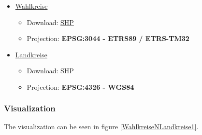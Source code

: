 \begin{itemize}
\itemsep1pt\parskip0pt
\item
	\href{http://www.bundeswahlleiter.de/en/bundestagswahlen/BTW_BUND_13/wahlkreiseinteilung/kartographische_darstellung.html}{Wahlkreise}

	\begin{itemize}
	\itemsep1pt\parskip0pt
	\item 
	Download:
	\href{http://www.bundeswahlleiter.de/de/bundestagswahlen/BTW_BUND_13/wahlkreiseinteilung/wahlkreisgeometrie/Geometrie_Wahlkreise_18DBT_VG1000_ETRS89.zip}{SHP}
	\item
	Projection: \textbf{EPSG:3044 - ETRS89 / ETRS-TM32}

\end{itemize}

\item
	\href{http://www.gadm.org/country}{Landkreise}
	
	\begin{itemize}
	\itemsep1pt\parskip0pt
	\item 
	Download: \href{http://biogeo.ucdavis.edu/data/gadm2/shp/DEU_adm.zip}{SHP}
	\item
	Projection: \textbf{EPSG:4326 - WGS84}
	\end{itemize}

\end{itemize}
\subsubsection{Visualization}\label{visualization}


The visualization can be seen in figure \ref{WahlkreiseNLandkreise1}.

